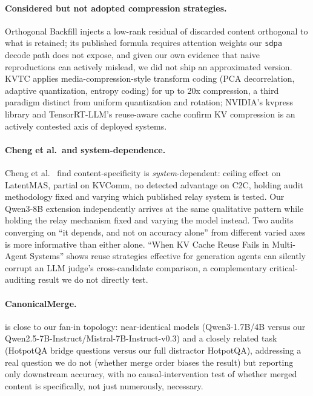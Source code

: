 \documentclass[11pt]{article}
\begin{document}
\paragraph{Considered but not adopted compression strategies.}
Orthogonal Backfill \citep{orthobackfill2026} injects a low-rank
residual of discarded content orthogonal to what is retained; its
published formula requires attention weights our \texttt{sdpa} decode
path does not expose, and given our own evidence that naive
reproductions can actively mislead, we did not ship an approximated
version. KVTC \citep{kvtc2026} applies media-compression-style
transform coding (PCA decorrelation, adaptive quantization, entropy
coding) for up to 20x compression, a third paradigm distinct from
uniform quantization and rotation; NVIDIA's kvpress library and
TensorRT-LLM's reuse-aware cache confirm KV compression is an actively
contested axis of deployed systems.

\paragraph{Cheng et al.\ and system-dependence.} Cheng et al.\
\citep{latentcommpay2026} find content-specificity is
\emph{system}-dependent: ceiling effect on LatentMAS, partial on
KVComm, no detected advantage on C2C, holding audit methodology fixed
and varying which published relay system is tested. Our Qwen3-8B
extension independently arrives at the same qualitative pattern while
holding the relay mechanism fixed and varying the model instead. Two
audits converging on ``it depends, and not on accuracy alone'' from
different varied axes is more informative than either alone. ``When KV
Cache Reuse Fails in Multi-Agent Systems'' \citep{kvreusefails2026}
shows reuse strategies effective for generation agents can silently
corrupt an LLM judge's cross-candidate comparison, a complementary
critical-auditing result we do not directly test.

\paragraph{CanonicalMerge.} \citep{canonicalmerge2026} is close to our
fan-in topology: near-identical models (Qwen3-1.7B/4B versus our
Qwen2.5-7B-Instruct/Mistral-7B-Instruct-v0.3) and a closely related task
(HotpotQA bridge questions versus our full distractor HotpotQA),
addressing a real question we do not (whether merge order biases the
result) but reporting only downstream accuracy, with no
causal-intervention test of whether merged content is specifically, not
just numerously, necessary.
\end{document}
